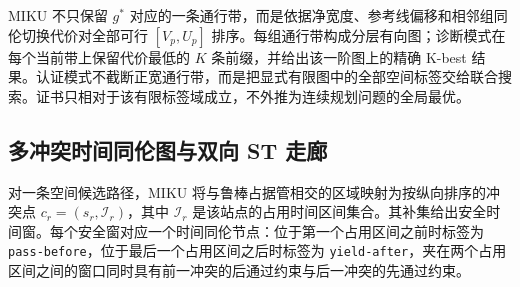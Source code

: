 MIKU 不只保留 $g^*$ 对应的一条通行带，而是依据净宽度、参考线偏移和相邻组同伦切换代价对全部可行 $[V_p,U_p]$ 排序。每组通行带构成分层有向图；诊断模式在每个当前带上保留代价最低的 $K$ 条前缀，并给出该一阶图上的精确 K-best 结果。认证模式不截断正宽通行带，而是把显式有限图中的全部空间标签交给联合搜索。证书只相对于该有限标签域成立，不外推为连续规划问题的全局最优。

\subsection{多冲突时间同伦图与双向 ST 走廊}

对一条空间候选路径，MIKU 将与鲁棒占据管相交的区域映射为按纵向排序的冲突点 $c_r=(s_r,\mathcal I_r)$，其中 $\mathcal I_r$ 是该站点的占用时间区间集合。其补集给出安全时间窗。每个安全窗对应一个时间同伦节点：位于第一个占用区间之前时标签为 \texttt{pass-before}，位于最后一个占用区间之后时标签为 \texttt{yield-after}，夹在两个占用区间之间的窗口同时具有前一冲突的后通过约束与后一冲突的先通过约束。

